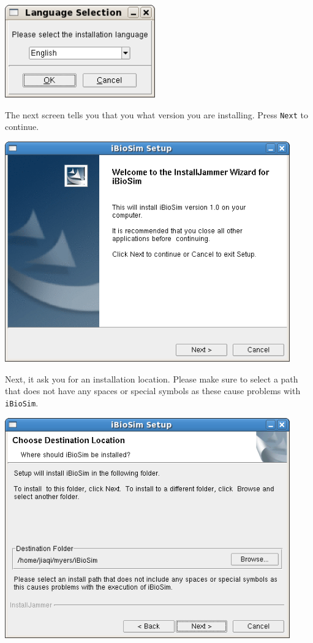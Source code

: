 \documentclass[titlepage,11pt]{article}
\begin{document}
\includegraphics[height=40mm]{screenshots/language}

The next screen tells you that you what version you are installing.
Press {\tt Next} to continue.

\includegraphics[height=95mm]{screenshots/setup}

\clearpage

Next, it ask you for an installation location.  Please make sure to
select a path that does not have any spaces or special symbols as
these cause problems with {\tt iBioSim}.

\includegraphics[height=95mm]{screenshots/location}
\end{document}
